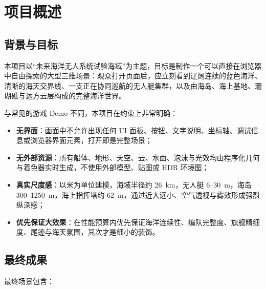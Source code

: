 \documentclass[UTF8, a4paper, 11pt]{ctexart}
\begin{document}
\newpage
\tableofcontents
\newpage

\setcounter{page}{1}

\section{项目概述}

\subsection{背景与目标}

本项目以“未来海洋无人系统试验海域”为主题，目标是制作一个可以直接在浏览器中自由探索的大型三维场景：观众打开页面后，应立刻看到辽阔连续的蓝色海洋、清晰的海天交界线、一支正在协同巡航的无人艇集群，以及由海岛、海上基地、珊瑚礁与远方云层构成的完整海洋世界。

与常见的游戏 Demo 不同，本项目在约束上非常明确：

\begin{itemize}
  \item \textbf{无界面}：画面中不允许出现任何 UI 面板、按钮、文字说明、坐标轴、调试信息或浏览器界面元素，打开即是完整场景；
  \item \textbf{无外部资源}：所有船体、地形、天空、云、水面、泡沫与光效均由程序化几何与着色器实时生成，不使用外部模型、贴图或 HDR 环境图；
  \item \textbf{真实尺度感}：以米为单位建模，海域半径约 26~km，无人艇 6--30~m，海岛 300--1250~m，海上指挥塔约 62~m，通过近大远小、空气透视与雾效形成强烈纵深感；
  \item \textbf{优先保证大效果}：在性能预算内优先保证海洋连续性、编队完整度、旗舰精细度、尾迹与海天氛围，其次才是细小的装饰。
\end{itemize}

\subsection{最终成果}

最终场景包含：
\end{document}
